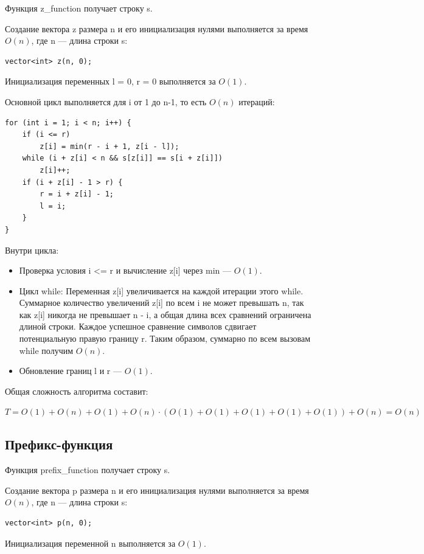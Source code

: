 \documentclass[otchet]{SCWorks}
\begin{document}
Функция z\_function получает строку s.

Создание вектора z размера n и его инициализация нулями выполняется за время $O(n)$, где n — длина строки s:
\begin{verbatim}
vector<int> z(n, 0);
\end{verbatim}

Инициализация переменных l = 0, r = 0 выполняется за $O(1)$.

Основной цикл выполняется для i от 1 до n-1, то есть $O(n)$ итераций:
\begin{verbatim}
for (int i = 1; i < n; i++) {
    if (i <= r)
        z[i] = min(r - i + 1, z[i - l]);
    while (i + z[i] < n && s[z[i]] == s[i + z[i]])
        z[i]++;
    if (i + z[i] - 1 > r) {
        r = i + z[i] - 1;
        l = i;
    }
}
\end{verbatim}

Внутри цикла:
\begin{itemize}
    \item Проверка условия i <= r и вычисление z[i] через min --- $O(1)$.
    \item Цикл while: Переменная z[i] увеличивается на каждой итерации этого while. 
    Суммарное количество увеличений z[i] по всем i не может превышать n, так как z[i] никогда не превышает n - i,
    а общая длина всех сравнений ограничена длиной строки. Каждое успешное сравнение символов сдвигает
    потенциальную правую границу r. Таким образом, суммарно по всем вызовам while получим $O(n)$.
    \item Обновление границ l и r --- $O(1)$.
\end{itemize}

Общая сложность алгоритма составит:

$T = O(1) + O(n) + O(1) + O(n) · (O(1) + O(1) + O(1) + O(1) + O(1)) + O(n) = O(n)$

\subsection{Префикс-функция}

Функция prefix\_function получает строку s.

Создание вектора p размера n и его инициализация нулями выполняется за время $O(n)$, где n — длина строки s:
\begin{verbatim}
vector<int> p(n, 0);
\end{verbatim}

Инициализация переменной n выполняется за $O(1)$.
\end{document}
